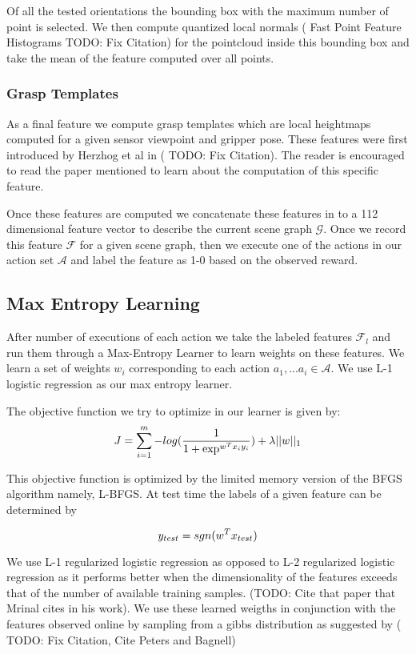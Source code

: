 Of all the tested orientations the bounding box with the maximum number of point is selected. We then compute quantized local normals ( Fast Point Feature Histograms \cite{Javidi12_Journal} TODO: Fix Citation) for the pointcloud inside this bounding box and take the mean of the feature computed over all points.

\subsubsection{Grasp Templates}
As a final feature we compute grasp templates which are local heightmaps computed for a given sensor viewpoint and gripper pose. These features were first introduced by Herzhog et al in (\cite{Javidi12_Journal} TODO: Fix Citation). The reader is encouraged to read the paper mentioned to learn about the computation of this specific feature.

Once these features are computed we concatenate these features in to a 112 dimensional feature vector to describe the current scene graph $\mathcal{G}$. Once we record this feature $\mathcal{F}$ for a given scene graph, then we execute one of the actions in our action set $\mathcal{A}$ and label the feature as 1-0 based on the observed reward.

\subsection{Max Entropy Learning}
After number of executions of each action we take the labeled features $\mathcal{F}_l$ and run them through a Max-Entropy Learner to learn weights on these features. We learn a set of weights $w_i$ corresponding to each action ${a_1,...a_i}\in \mathcal{A}$. We use L-1 logistic regression as our max entropy learner.

The objective function we try to optimize in our learner is given by:
\[
J = \sum_{i=1}^m-log(\frac{1}{1+\exp^{w^Tx_iy_i}}) + \lambda||w||_1\\
\]

This objective function is optimized by the limited memory version of the BFGS algorithm namely, L-BFGS. At test time the labels of a given feature can be determined by 

\[
y_{test} = sgn(w^Tx_{test})\\
\]

We use L-1 regularized logistic regression as opposed to L-2 regularized logistic regression as it performs better when the dimensionality of the features exceeds that of the number of available training samples. (TODO: Cite that paper that Mrinal cites in his work). We use these learned weigths in conjunction with the features observed online by sampling from a gibbs distribution as suggested by (\cite{Javidi12_Journal} TODO: Fix Citation, Cite Peters and Bagnell)

